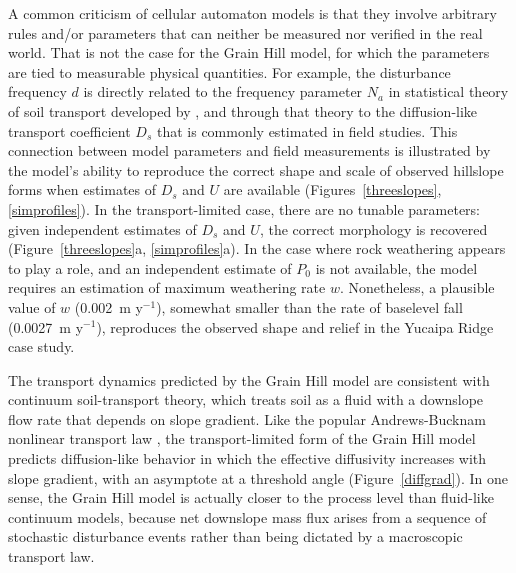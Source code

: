 \documentclass[esurf, manuscript]{copernicus}
\begin{document}
A common criticism of cellular automaton models is that they involve arbitrary rules and/or parameters that can neither be measured nor verified in the real world. That is not the case for the Grain Hill model, for which the parameters are tied to measurable physical quantities. For example, the disturbance frequency $d$ is directly related to the frequency parameter $N_a$ in statistical theory of soil transport developed by \citet{furbish2009statistical}, and through that theory to the diffusion-like transport coefficient $D_s$ that is commonly estimated in field studies. This connection between model parameters and field measurements is illustrated by the model's ability to reproduce the correct shape and scale of observed hillslope forms when estimates of $D_s$ and $U$ are available (Figures~\ref{threeslopes}, \ref{simprofiles}). In the transport-limited case, there are no tunable parameters: given independent estimates of $D_s$ and $U$, the correct morphology is recovered (Figure~\ref{threeslopes}a, \ref{simprofiles}a). In the case where rock weathering appears to play a role, and an independent estimate of $P_0$ is not available, the model requires an estimation of maximum weathering rate $w$. Nonetheless, a plausible value of $w$ (0.002~m y$^{-1}$), somewhat smaller than the rate of baselevel fall (0.0027~m y$^{-1}$), reproduces the observed shape and relief in the Yucaipa Ridge case study. 

The transport dynamics predicted by the Grain Hill model are consistent with continuum soil-transport theory, which treats soil as a fluid with a downslope flow rate that depends on slope gradient. Like the popular Andrews-Bucknam nonlinear transport law \citep[e.g.,][]{andrews1987fitting,howard1994detachment,roering1999evidence}, the transport-limited form of the Grain Hill model predicts diffusion-like behavior in which the effective diffusivity increases with slope gradient, with an asymptote at a threshold angle (Figure~\ref{diffgrad}). In one sense, the Grain Hill model is actually closer to the process level than fluid-like continuum models, because net downslope mass flux arises from a sequence of stochastic disturbance events rather than being dictated by a macroscopic transport law.
\end{document}

